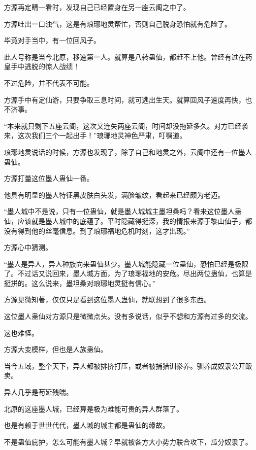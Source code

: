 
\begin{this_body}



方源再定睛一看时，发现自己已经置身在另一座云阁之中了。

方源吐出一口浊气，这是有琅琊地灵帮忙，否则自己脱身恐怕就有危险了。

毕竟对手当中，有一位回风子。

此人号称是当今北原，移速第一人。就算是八转蛊仙，都赶不上他。曾经有过在药皇手中逃脱的惊人战绩！

不过危险，并不代表不可能。

方源手中有定仙游，只要争取三息时间，就可逃出生天。就算回风子速度再快，也不济事。

“本来就只剩下五座云阁，这次又连失两座云阁，时间却没拖延多久。对方已经袭来，这次我们三个一起出手！”琅琊地灵神色严肃，叮嘱道。

琅琊地灵说话的时候，方源也发现了，除了自己和地灵之外，云阁中还有一位墨人蛊仙。

方源打量这位墨人蛊仙一番。

他具有明显的墨人特征黑皮肤白头发，满脸皱纹，看起来已经颇为老迈。

“墨人城中不是说，只有一位蛊仙，就是墨人城城主墨坦桑吗？看来这位墨人蛊仙，应该就是墨人城中的底蕴了。平时隐藏得挺深，我的情报来源于黎山仙子，都没有得到他的丝毫信息。到了琅琊福地危机时刻，这才出现。”

方源心中猜测。

“墨人是异人，异人种族向来蛊仙甚少。墨人城能隐藏一位蛊仙，恐怕已经是极限了。不过话又说回来，墨人城方面，为了琅琊福地的安危。尽出两位蛊仙，也算是挺拼的。这么说来，墨坦桑对琅琊地灵挺有信心。”

方源见微知著，仅仅只是看到这位墨人蛊仙，就联想到了很多东西。

这位墨人蛊仙对方源只是微微点头。没有多说话，似乎不想和方源有过多的交流。

这也难怪。

方源大变模样，但也是人族蛊仙。

当今五域，整个天下，异人都被排挤打压，或者被捕猎训豢养。驯养成奴隶公开贩卖。

异人几乎是苟延残喘。

北原的这座墨人城，已经算是极为难能可贵的异人群落了。

也是有赖于世世代代，墨人城的城主都是蛊仙的缘故。

不是蛊仙庇护，怎么可能有墨人城？早就被各方大小势力联合攻下，瓜分奴隶了。


\end{this_body}

